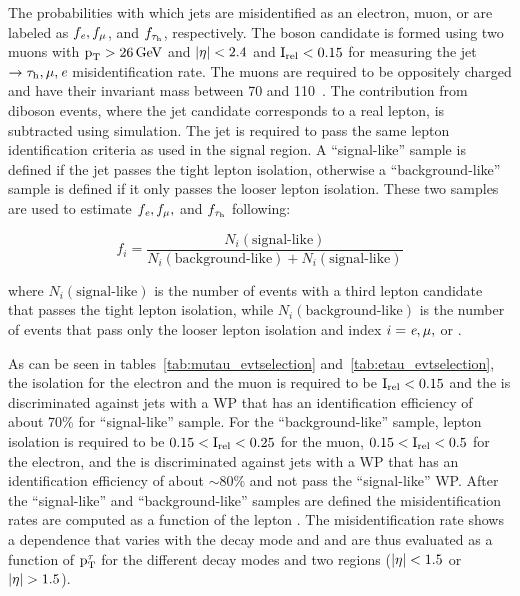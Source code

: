 The probabilities with which jets are misidentified as an electron, muon, or \tauh are labeled as $f_\textit{e}, f_\mu$, and $f_{\tau_{\text{h}}}$, respectively. The \PZ boson candidate is formed using two muons with $\text{p}_\text{T} > 26 \,\text{Ge\hspace{-.08em}V}$ and $\lvert\eta\rvert < 2.4$ and $\text{I}_\text{rel} < 0.15$ for measuring the jet $\to\tau_{\text{h}}, \mu, \textit{e}$ misidentification rate. The muons are required to be oppositely charged and have their invariant mass between 70 and 110~\GeV. The contribution from diboson events, where the jet candidate corresponds to a real lepton, is subtracted using simulation. The jet is required to pass the same lepton identification criteria as used in the signal region. A ``signal-like'' sample is defined if the jet passes the tight lepton isolation, otherwise a ``background-like'' sample is defined if it only passes the looser lepton isolation. These two samples are used to estimate $f_\textit{e}, f_\mu,$ and $f_{\tau_{\text{h}}}$ following:
\begin{linenomath*}
  \begin{equation*}
    f_{i} = \frac{N_i(\text{signal-like})}{N_{i}(\text{background-like}) + N_i(\text{signal-like})}
  \end{equation*}
\end{linenomath*}
where $N_i(\text{signal-like})$ is the number of events with a third lepton candidate that passes the tight lepton isolation, while $N_i(\text{background-like})$ is the number of events that pass only the looser lepton isolation and index $i = \textit{e}, \mu,$ or \Pgt.

As can be seen in tables~\ref{tab:mutau_evtselection} and~\ref{tab:etau_evtselection}, the isolation for the electron and the muon is required to be $\text{I}_\text{rel} < 0.15$ and the \tauh is discriminated against jets with a WP that has an identification efficiency of about 70\% for ``signal-like'' sample. For the ``background-like'' sample, lepton isolation is required to be $0.15 < \text{I}_\text{rel} < 0.25$ for the muon, $0.15 < \text{I}_\text{rel} < 0.5$ for the electron, and the \tauh is discriminated against jets with a WP that has an identification efficiency of about $\sim 80\%$ and not pass the ``signal-like'' WP. After the ``signal-like'' and ``background-like'' samples are defined the misidentification rates are computed as a function of the lepton \pt. The \tauh misidentification rate shows a \pt dependence that varies with the \tauh decay mode and \aeta and are thus evaluated as a function of $\text{p}_\text{T}^{\tau}$ for the different decay modes and two \aeta regions ($\lvert\eta\rvert < 1.5$ or $\lvert\eta\rvert > 1.5$).

